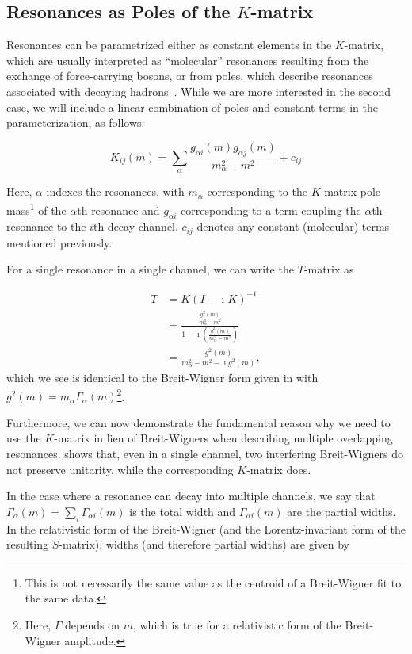 \subsection{Resonances as Poles of the $K$-matrix}

Resonances can be parametrized either as constant elements in the $K$-matrix, which are usually interpreted as ``molecular'' resonances resulting from the exchange of force-carrying bosons, or from poles, which describe resonances associated with decaying hadrons~\cite{Au1987}. While we are more interested in the second case, we will include a linear combination of poles and constant terms in the parameterization, as follows:

\begin{equation}
  K_{ij}(m) = \sum_{\alpha} \frac{g_{\alpha i}(m) g_{\alpha j}(m)}{m_\alpha^2 - m^2} + c_{ij}
  \label{eq:k-matrix-parameterization}
\end{equation}

Here, $\alpha$ indexes the resonances, with $m_\alpha$ corresponding to the $K$-matrix pole mass\footnote{This is not necessarily the same value as the centroid of a Breit-Wigner fit to the same data.} of the $\alpha$th resonance and $g_{\alpha i}$ corresponding to a term coupling the $\alpha$th resonance to the $i$th decay channel. $c_{ij}$ denotes any constant (molecular) terms mentioned previously.

For a single resonance in a single channel, we can write the $T$-matrix as

\begin{align}
  T &= K(I-\imath K)^{-1} \\
    &= \frac{\frac{g^2(m)}{m_\alpha^2 - m^2}}{1 - \imath \left(\frac{g^2(m)}{m_\alpha^2 - m^2}\right)} \\
    &= \frac{g^2(m)}{m_\alpha^2 - m^2 - \imath g^2(m)},
\end{align}
which we see is identical to the Breit-Wigner form given in  with $g^2(m) = m_\alpha\Gamma_\alpha(m)$\footnote{Here, $\Gamma$ depends on $m$, which is true for a relativistic form of the Breit-Wigner amplitude.}.

Furthermore, we can now demonstrate the fundamental reason why we need to use the $K$-matrix in lieu of Breit-Wigners when describing multiple overlapping resonances.  shows that, even in a single channel, two interfering Breit-Wigners do not preserve unitarity, while the corresponding $K$-matrix does.

In the case where a resonance can decay into multiple channels, we say that $\Gamma_\alpha(m) = \sum_i \Gamma_{\alpha i}(m)$ is the total width and $\Gamma_{\alpha i}(m)$ are the partial widths. In the relativistic form of the Breit-Wigner (and the Lorentz-invariant form of the resulting $S$-matrix), widths (and therefore partial widths) are given by

